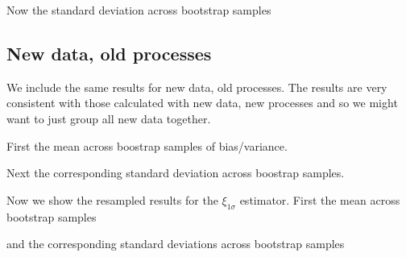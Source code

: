 

Now the standard deviation across bootstrap samples



\subsection{New data, old processes}

We include the same results for new data, old processes. The results are very
consistent with those calculated with new data, new processes and so we might
want to just group all new data together.

First the mean across boostrap samples of bias/variance.



Next the corresponding standard deviation across boostrap samples.



Now we show the resampled results for the $\xi_{1\sigma}$ estimator. First
the mean across bootstrap samples



and the corresponding standard deviations across bootstrap samples


